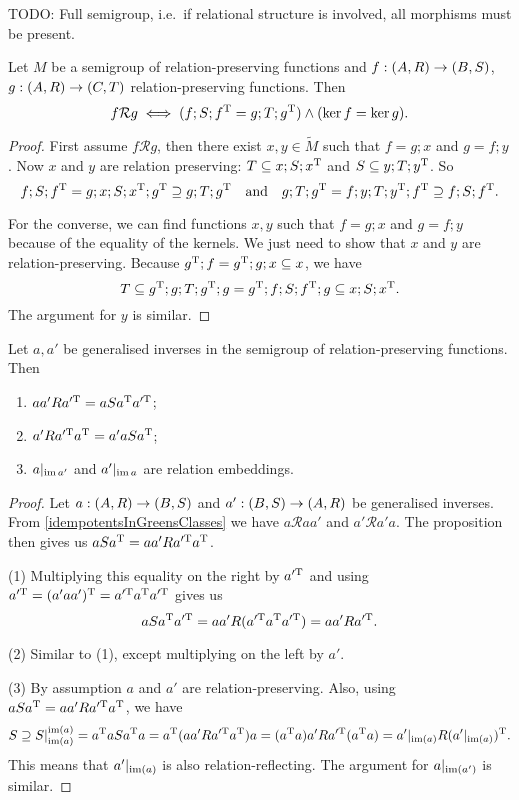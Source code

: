 TODO: Full semigroup, i.e.\ if relational structure is involved, all morphisms must be present.
\begin{proposition}
Let $M$ be a semigroup of relation-preserving functions and $f: \left( A, R \right) \to \left( B,S \right)$, $g: \left( A, R \right) \to \left( C,T \right)$ relation-preserving functions. Then
\[ f\mathcal{R}g \iff (f;S;f^{\mathrm{T}} = g;T;g^{\mathrm{T}})\land (\ker f = \ker g). \]
\end{proposition}
\begin{proof}
First assume $f\mathcal{R}g$, then there exist $x,y\in \tilde{M}$ such that $f = g;x$ and $g = f;y$. Now $x$ and $y$ are relation preserving: $T \subseteq x;S;x^{\mathrm{T}}$ and $S \subseteq y;T;y^{\mathrm{T}}$. So
\[ f;S;f^{\mathrm{T}} = g;x;S;x^{\mathrm{T}};g^{\mathrm{T}} \supseteq g;T;g^{\mathrm{T}} \quad\text{and}\quad g;T;g^{\mathrm{T}} = f;y;T;y^{\mathrm{T}};f^{\mathrm{T}}  \supseteq f;S;f^{\mathrm{T}}. \]

For the converse, we can find functions $x,y$ such that $f = g;x$ and $g = f;y$ because of the equality of the kernels. We just need to show that $x$ and $y$ are relation-preserving. Because $g^{\mathrm{T}};f = g^{\mathrm{T}};g;x \subseteq x$, we have
\[ T \subseteq g^{\mathrm{T}};g;T;g^{\mathrm{T}};g = g^{\mathrm{T}};f;S;f^{\mathrm{T}};g \subseteq x;S;x^{\mathrm{T}}. \]
The argument for $y$ is similar.
\end{proof}
\begin{corollary} \label{relationPreservingGeneralisedInversesEmbeddings}
Let $a,a'$ be generalised inverses in the semigroup of relation-preserving functions. Then
\begin{enumerate}
\item $aa'R a^{\prime\mathrm{T}} = aSa^{\mathrm{T}} a^{\prime\mathrm{T}}$;
\item $a'R a^{\prime\mathrm{T}}a^{\mathrm{T}} = a'aSa^{\mathrm{T}}$;
\item $a|_{\operatorname{im} a'}$ and $a'|_{\operatorname{im} a}$ are relation embeddings.
\end{enumerate}
\end{corollary}
\begin{proof}
Let $a: \left( A,R \right) \to \left( B,S \right)$ and $a': \left( B,S \right) \to \left( A,R \right)$ be generalised inverses. From \ref{idempotentsInGreensClasses} we have $a\mathcal{R}aa'$ and $a'\mathcal{R}a'a$. The proposition then gives us $aSa^{\mathrm{T}} = aa'Ra^{\prime\mathrm{T}} a^{\mathrm{T}}$.

(1) Multiplying this equality on the right by $a^{\prime\mathrm{T}}$ and using $a^{\prime\mathrm{T}} = (a'aa')^{\mathrm{T}} = a^{\prime\mathrm{T}} a^{\mathrm{T}} a^{\prime\mathrm{T}}$ gives us
\[ aSa^{\mathrm{T}} a^{\prime\mathrm{T}} = aa'R(a^{\prime\mathrm{T}} a^{\mathrm{T}} a^{\prime\mathrm{T}}) = aa'Ra^{\prime\mathrm{T}}. \]

(2) Similar to (1), except multiplying on the left by $a'$.

(3) By assumption $a$ and $a'$ are relation-preserving. Also, using $aSa^{\mathrm{T}} = aa'Ra^{\prime\mathrm{T}} a^{\mathrm{T}}$, we have
\[ S \supseteq S|_{\operatorname{im}(a)}^{\operatorname{im}(a)} = a^{\mathrm{T}} aSa^{\mathrm{T}} a = a^{\mathrm{T}} (aa'Ra^{\prime\mathrm{T}} a^{\mathrm{T}}) a = (a^{\mathrm{T}} a)a'Ra^{\prime\mathrm{T}} (a^{\mathrm{T}} a) = a'|_{\operatorname{im}(a)}R(a'|_{\operatorname{im}(a)})^{\mathrm{T}}. \]
This means that $a'|_{\operatorname{im}(a)}$ is also relation-reflecting. The argument for $a|_{\operatorname{im}(a')}$ is similar.
\end{proof}


